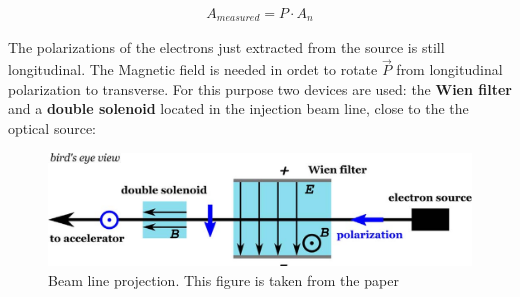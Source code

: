 \begin{align*}
A_{measured} = P \cdot A_{n}
\end{align*}

The polarizations of the electrons just extracted from the source is still longitudinal. The Magnetic field is needed in ordet to rotate $\vec{P}$ from longitudinal polarization to transverse. For this purpose two devices are used: the \textbf{Wien filter} and a \textbf{double solenoid} located in the injection beam line, close to the the optical source: 

\begin{figure}[hbtp]
\centering
\includegraphics[width = \textwidth]{ExperimentalSetup/injection.png}
\caption{Beam line projection. This figure is taken from the paper \cite{Schlimme_2017}}
\end{figure}


